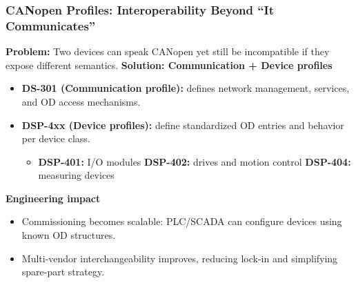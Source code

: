 \begin{frame}
	\frametitle{CANopen Profiles: Interoperability Beyond “It Communicates”}
	\small
	\textbf{Problem:} Two devices can speak CANopen yet still be incompatible if they expose different semantics.
	\textbf{Solution: Communication + Device profiles}
	\begin{itemize}
		\item \textbf{DS-301 (Communication profile):} defines network management, services, and OD access mechanisms.
		\item \textbf{DSP-4xx (Device profiles):} define standardized OD entries and behavior per device class.
		\begin{itemize}\footnotesize
			\item \textbf{DSP-401:} I/O modules \quad
				\textbf{DSP-402:} drives and motion control \quad
				\textbf{DSP-404:} measuring devices
		\end{itemize}
	\end{itemize}
	\textbf{Engineering impact}
	\begin{itemize}
		\item Commissioning becomes scalable: PLC/SCADA can configure devices using known OD structures.
		\item Multi-vendor interchangeability improves, reducing lock-in and simplifying spare-part strategy.
	\end{itemize}
\end{frame}

